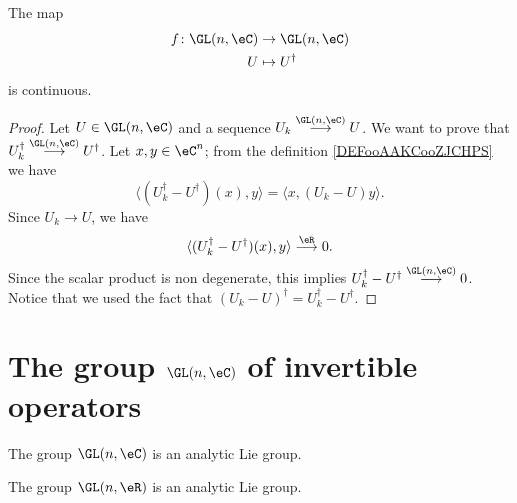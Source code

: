\begin{lemma}        \label{LEMooZILJooFfDEAF}
	The map
	\begin{equation}
		\begin{aligned}
			f\colon \GL(n,\eC) & \to \GL(n,\eC)   \\
			U                  & \mapsto U^{\dag}
		\end{aligned}
	\end{equation}
	is continuous.
\end{lemma}

\begin{proof}
	Let \( U\in\GL(n,\eC)\) and a sequence \( U_k\stackrel{\GL(n,\eC)}{\longrightarrow}U\). We want to prove that \( U_k^{\dag}\stackrel{\GL(n,\eC)}{\longrightarrow}U^{\dag}\). Let \( x,y\in \eC^n\); from the definition \ref{DEFooAAKCooZJCHPS} we have
	\begin{equation}
		\langle (U_k^{\dag}-U^{\dag})(x),y \rangle =\langle x, (U_k-U)y \rangle .
	\end{equation}
	Since \( U_k\to U\), we have
	\begin{equation}
		\langle (U_k^{\dag}-U^{\dag})(x),y \rangle \stackrel{\eR}{\longrightarrow}0.
	\end{equation}
	Since the scalar product is non degenerate, this implies \( U_k^{\dag}-U^{\dag}\stackrel{\GL(n,\eC)}{\longrightarrow}0\). Notice that we used the fact that \( (U_k-U)^{\dag}=U_k^{\dag}-U^{\dag}\).
\end{proof}

\section{The group \texorpdfstring{$ \GL(n,\eC)$}{GLnC} of invertible operators}

\begin{proposition}     \label{PROPooWRVKooLfqLfV}
	The group \( \GL(n,\eC)\) is an analytic Lie group.
\end{proposition}
\noproof

\begin{proposition}		\label{PROPooPZABooXxQkFi}
	The group \( \GL(n,\eR)\) is an analytic Lie group.
\end{proposition}
\noproof

